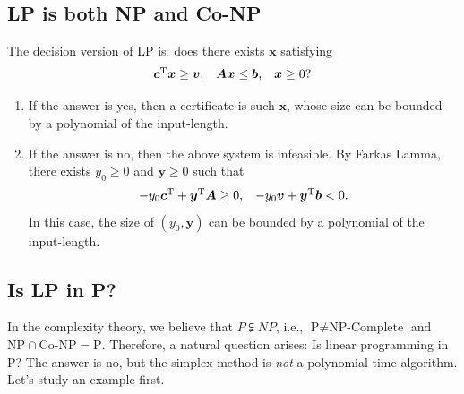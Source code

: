 \subsection{LP is both NP and Co-NP}
The decision version of LP is: does there exists $\bm x$ satisfying
\[
\begin{array}{lll}
\bm c^{\mathrm T}\bm x\ge\bm v,
&
\bm{Ax}\le\bm b,
&
\bm x\ge0?
\end{array}
\]
\begin{enumerate}
\item
If the answer is yes, then a certificate is such $\bm x$, whose size can be bounded by a polynomial of the input-length.
\item
If the answer is no, then the above system is infeasible. By Farkas Lamma, there exists $y_0\ge0$ and $\bm y\ge0$ such that 
\[
\begin{array}{ll}
-y_0\bm c^{\mathrm T} + \bm y^{\mathrm T}\bm A\ge0,
&
-y_0\bm v + \bm y^{\mathrm T}\bm b<0.
\end{array}
\]
In this case, the size of $(y_0,\bm y)$ can be bounded by a polynomial of the input-length.
\end{enumerate}

\subsection{Is LP in P?}

In the complexity theory, we believe that $P\subsetneqq NP$, i.e., $\text{P} \ne \text{NP-Complete}$ and $\text{NP}\cap\text{Co-NP}  =\text{P}$. Therefore, a natural question arises: Is linear programming in P? The answer is no, but the simplex method is \emph{not} a polynomial time algorithm. Let's study an example first.

